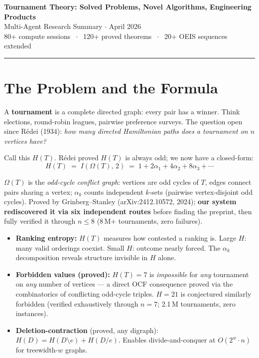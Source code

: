 \documentclass[10pt,letterpaper]{article}
\begin{document}
\begin{center}
  {\LARGE\bfseries Tournament Theory: Solved Problems, Novel Algorithms, Engineering Products}\\[2pt]
  {\large\color{accent} Multi-Agent Research Summary $\cdot$ April 2026}\\[1pt]
  {\small 80+ compute sessions $\;\cdot\;$ 120+ proved theorems $\;\cdot\;$ 20+ OEIS sequences extended}
\end{center}

\vspace{-2pt}\hrule\vspace{4pt}

\section{The Problem and the Formula}

A \textbf{tournament} is a complete directed graph: every pair has a winner. Think elections,
round-robin leagues, pairwise preference surveys. The question open since R\'{e}dei (1934):
\emph{how many directed Hamiltonian paths does a tournament on $n$ vertices have?}

Call this $H(T)$. R\'{e}dei proved $H(T)$ is always odd; we now have a closed-form:
\vspace{-1pt}
\begin{equation*}
  \boxed{H(T) \;=\; I\!\left(\Omega(T),\, 2\right) \;=\; 1 + 2\alpha_1 + 4\alpha_2 + 8\alpha_3 + \cdots}
\end{equation*}
\vspace{-3pt}

$\Omega(T)$ is the \emph{odd-cycle conflict graph}: vertices are odd cycles of $T$, edges connect
pairs sharing a vertex; $\alpha_k$ counts independent $k$-sets (pairwise vertex-disjoint odd cycles).
Proved by Grinberg--Stanley (arXiv:2412.10572, 2024); \textbf{our system rediscovered it via six
independent routes} before finding the preprint, then fully verified it through $n\leq 8$
(8\,M$+$ tournaments, zero failures).

\begin{itemize}
  \item \textbf{Ranking entropy:} $H(T)$ measures how contested a ranking is.
    Large $H$: many valid orderings coexist. Small $H$: outcome nearly forced.
    The $\alpha_k$ decomposition reveals structure invisible in $H$ alone.
  \item \textbf{Forbidden values (proved):} $H(T) = 7$ is \emph{impossible} for \emph{any}
    tournament on \emph{any} number of vertices — a direct OCF consequence proved via the
    combinatorics of conflicting odd-cycle triples. $H=21$ is conjectured similarly forbidden
    (verified exhaustively through $n=7$; 2.1\,M tournaments, zero instances).
  \item \textbf{Deletion-contraction} (proved, any digraph):
    $H(D) = H(D\setminus e) + H(D/e)$.
    Enables divide-and-conquer at $O(2^w\cdot n)$ for treewidth-$w$ graphs.
\end{itemize}
\end{document}
